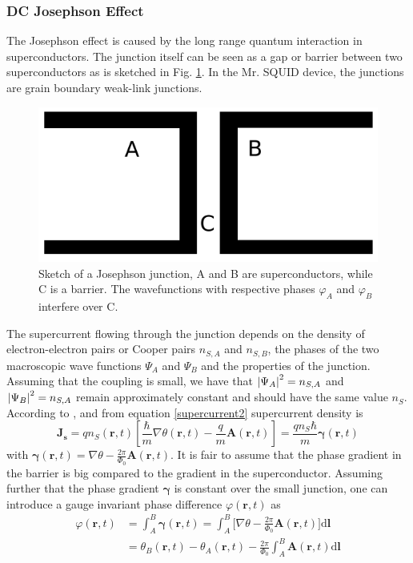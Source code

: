 \documentclass[a4paper,10pt]{article}
\newcommand{\dif}{\mathrm{d}}
\begin{document}
\subsubsection*{DC Josephson Effect}
The Josephson effect is caused by the long range quantum interaction in superconductors. The junction itself can be seen as a gap or barrier between two superconductors as is sketched in Fig. \ref{figure_josephson_junction}. In the Mr. SQUID \cite{skriptum} device, the junctions are grain boundary weak-link junctions. 

\begin{figure}[htp!]
    \centering
    \includegraphics[width = 0.4 \textwidth]{josephson.png}
    \caption{Sketch of a Josephson junction, A and B are superconductors, while C is a barrier. The wavefunctions with respective phases $\varphi_A$ and $\varphi_B$ interfere over  C.}
    \label{figure_josephson_junction}
\end{figure}

The supercurrent flowing through the junction depends on the density of electron-electron pairs or Cooper pairs $n_{S,A}$ and $n_{S,B}$, the phases of the two macroscopic wave functions $\Psi_A$ and $\Psi_B$ and the properties of the junction. Assuming that the coupling is small, we have that $\abs{\Psi_A}^2 = n_{S,A}$ and $\abs{\Psi_B}^2 = n_{S,A}$ remain approximately constant and should have the same value $n_{S}$. 
According to \cite{grossmarx}, and from equation \eqref{supercurrent2} supercurrent density is
\begin{equation}
    \mathbf{J_s} = q n_S(\mathbf{r},t) \left[ \frac{\hbar}{m} \nabla \theta(\mathbf{r},t) - \frac{q}{m} \mathbf{A}(\mathbf{r},t) \right] = \frac{q n_S \hbar}{m} \mathbf{\gamma}(\mathbf{r},t)
\end{equation}
with $\mathbf{\gamma}(\mathbf{r},t) = \nabla \theta - \frac{2 \pi}{\Phi_0} \mathbf{A}(\mathbf{r},t)$. It is fair to assume that the phase gradient in the barrier is big compared to the gradient in the superconductor. Assuming further that the phase gradient $\mathbf{\gamma}$ is constant over the small junction, one can introduce a gauge invariant phase difference $\varphi(\mathbf{r}, t)$ as 
\begin{equation}
    \begin{split}
        \label{eq_phase}
        \varphi(\mathbf{r}, t) &= \int^B_A \mathbf{\gamma}(\mathbf{r},t) = \int^B_A \big[ \nabla \theta - \frac{2 \pi}{\Phi_0} \mathbf{A}(\mathbf{r},t) \big] \dif \mathbf{l} \\
        &= \theta_B(\mathbf{r}, t) - \theta_A(\mathbf{r}, t) - \frac{2 \pi}{\Phi_0} \int^B_A \mathbf{A}(\mathbf{r},t) \dif \mathbf{l}
    \end{split}
\end{equation}
\end{document}
